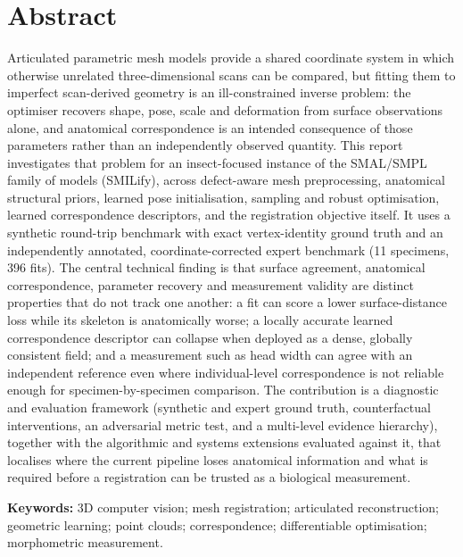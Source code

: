 \thispagestyle{plain}
\section*{Abstract}

Articulated parametric mesh models provide a shared coordinate system in
which otherwise unrelated three-dimensional scans can be compared, but
fitting them to imperfect scan-derived geometry is an ill-constrained inverse
problem: the optimiser recovers shape, pose, scale and deformation from
surface observations alone, and anatomical correspondence is an intended
consequence of those parameters rather than an independently observed
quantity. This report investigates that problem for an insect-focused
instance of the SMAL/SMPL family of models (SMILify), across defect-aware mesh
preprocessing, anatomical structural priors, learned pose initialisation,
sampling and robust optimisation, learned correspondence descriptors, and the
registration objective itself. It uses a synthetic round-trip benchmark with
exact vertex-identity ground truth and an independently annotated,
coordinate-corrected expert benchmark (11 specimens, 396 fits). The central
technical finding is that surface agreement, anatomical correspondence,
parameter recovery and measurement validity are distinct properties that do
not track one another: a fit can score a lower surface-distance loss while its
skeleton is anatomically worse; a locally accurate learned correspondence
descriptor can collapse when deployed as a dense, globally consistent field;
and a measurement such as head width can agree with an independent reference
even where individual-level correspondence is not reliable enough for
specimen-by-specimen comparison. The contribution is a diagnostic and
evaluation framework (synthetic and expert ground truth, counterfactual
interventions, an adversarial metric test, and a multi-level evidence
hierarchy), together with the algorithmic and systems extensions evaluated
against it, that localises where the current pipeline loses anatomical
information and what is required before a registration can be trusted as a
biological measurement.

\medskip
\noindent\textbf{Keywords:} 3D computer vision; mesh registration; articulated
reconstruction; geometric learning; point clouds; correspondence;
differentiable optimisation; morphometric measurement.
